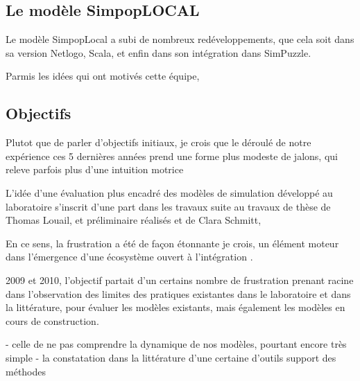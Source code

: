 %

%


\subsection{Le modèle SimpopLOCAL}

Le modèle SimpopLocal a subi de nombreux redéveloppements, que cela soit dans sa version Netlogo, Scala, et enfin dans son intégration dans SimPuzzle.

Parmis les idées qui ont motivés cette équipe,

\subsection{Objectifs}

Plutot que de parler d'objectifs initiaux, je crois que le déroulé de notre expérience ces 5 dernières années prend une forme plus modeste de jalons, qui releve parfois plus d'une intuition motrice

L'idée d'une évaluation plus encadré des modèles de simulation développé au laboratoire s'inscrit d'une part dans les travaux  suite au travaux de thèse de Thomas Louail, et  préliminaire réalisés et de Clara Schmitt,

En ce sens, la frustration a été de façon étonnante je crois, un élément moteur dans l'émergence d'une écosystème ouvert à l'intégration  .

 2009 et 2010, l'objectif partait d'un certains nombre de frustration prenant racine  dans l'observation des limites des pratiques existantes dans le laboratoire et dans la littérature, pour évaluer les modèles existants, mais également les modèles en cours de construction.

  - celle de ne pas comprendre la dynamique de nos modèles, pourtant encore très simple
  - la constatation dans la littérature d'une certaine d'outils support des méthodes

